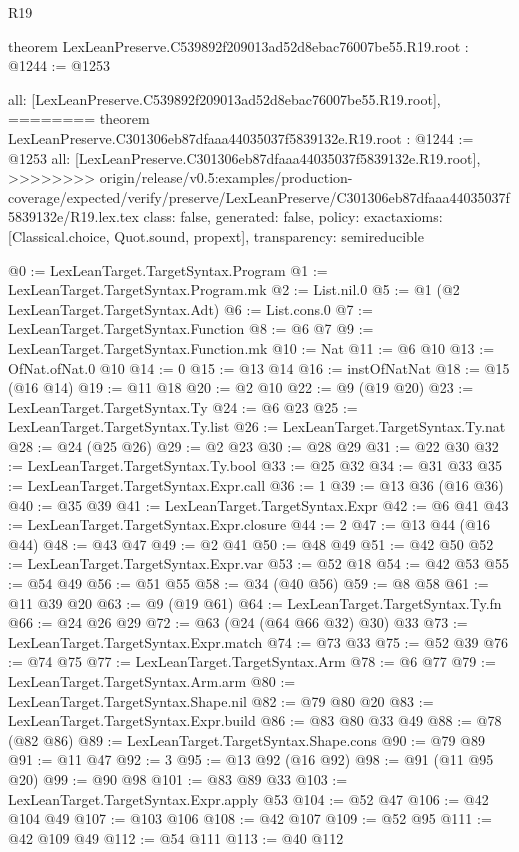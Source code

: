 \begin{lexlean}{R19}
\begin{coremodule}
{{{{{{{{{{{{{theorem LexLeanPreserve.C539892f209013ad52d8ebac76007be55.R19.root : @1244 := @1253 {
  all: [LexLeanPreserve.C539892f209013ad52d8ebac76007be55.R19.root],
========
theorem LexLeanPreserve.C301306eb87dfaaa44035037f5839132e.R19.root : @1244 := @1253 {
  all: [LexLeanPreserve.C301306eb87dfaaa44035037f5839132e.R19.root],
>>>>>>>> origin/release/v0.5:examples/production-coverage/expected/verify/preserve/LexLeanPreserve/C301306eb87dfaaa44035037f5839132e/R19.lex.tex
  class: false,
  generated: false,
  policy: exact{axioms: [Classical.choice, Quot.sound, propext]},
  transparency: semireducible
}

@0 := LexLeanTarget.TargetSyntax.Program
@1 := LexLeanTarget.TargetSyntax.Program.mk
@2 := List.nil.{0}
@5 := @1 (@2 LexLeanTarget.TargetSyntax.Adt)
@6 := List.cons.{0}
@7 := LexLeanTarget.TargetSyntax.Function
@8 := @6 @7
@9 := LexLeanTarget.TargetSyntax.Function.mk
@10 := Nat
@11 := @6 @10
@13 := OfNat.ofNat.{0} @10
@14 := 0
@15 := @13 @14
@16 := instOfNatNat
@18 := @15 (@16 @14)
@19 := @11 @18
@20 := @2 @10
@22 := @9 (@19 @20)
@23 := LexLeanTarget.TargetSyntax.Ty
@24 := @6 @23
@25 := LexLeanTarget.TargetSyntax.Ty.list
@26 := LexLeanTarget.TargetSyntax.Ty.nat
@28 := @24 (@25 @26)
@29 := @2 @23
@30 := @28 @29
@31 := @22 @30
@32 := LexLeanTarget.TargetSyntax.Ty.bool
@33 := @25 @32
@34 := @31 @33
@35 := LexLeanTarget.TargetSyntax.Expr.call
@36 := 1
@39 := @13 @36 (@16 @36)
@40 := @35 @39
@41 := LexLeanTarget.TargetSyntax.Expr
@42 := @6 @41
@43 := LexLeanTarget.TargetSyntax.Expr.closure
@44 := 2
@47 := @13 @44 (@16 @44)
@48 := @43 @47
@49 := @2 @41
@50 := @48 @49
@51 := @42 @50
@52 := LexLeanTarget.TargetSyntax.Expr.var
@53 := @52 @18
@54 := @42 @53
@55 := @54 @49
@56 := @51 @55
@58 := @34 (@40 @56)
@59 := @8 @58
@61 := @11 @39 @20
@63 := @9 (@19 @61)
@64 := LexLeanTarget.TargetSyntax.Ty.fn
@66 := @24 @26 @29
@72 := @63 (@24 (@64 @66 @32) @30) @33
@73 := LexLeanTarget.TargetSyntax.Expr.match
@74 := @73 @33
@75 := @52 @39
@76 := @74 @75
@77 := LexLeanTarget.TargetSyntax.Arm
@78 := @6 @77
@79 := LexLeanTarget.TargetSyntax.Arm.arm
@80 := LexLeanTarget.TargetSyntax.Shape.nil
@82 := @79 @80 @20
@83 := LexLeanTarget.TargetSyntax.Expr.build
@86 := @83 @80 @33 @49
@88 := @78 (@82 @86)
@89 := LexLeanTarget.TargetSyntax.Shape.cons
@90 := @79 @89
@91 := @11 @47
@92 := 3
@95 := @13 @92 (@16 @92)
@98 := @91 (@11 @95 @20)
@99 := @90 @98
@101 := @83 @89 @33
@103 := LexLeanTarget.TargetSyntax.Expr.apply @53
@104 := @52 @47
@106 := @42 @104 @49
@107 := @103 @106
@108 := @42 @107
@109 := @52 @95
@111 := @42 @109 @49
@112 := @54 @111
@113 := @40 @112
}}}}}}}}}}}}}}
\end{coremodule}
\end{lexlean}
